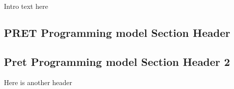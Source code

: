 Intro text here

\subsection{PRET Programming model Section Header}
\label{sec:pret_prog_model_sec_1}

\subsection{Pret Programming model Section Header 2}
\label{sec:pret_prog_model_sec_2}

Here is another header

